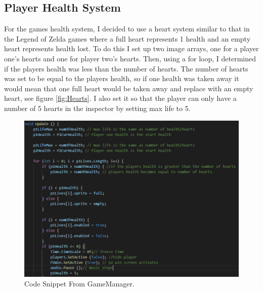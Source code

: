 \subsection{Player Health System}
For the games health system, I decided to use a heart system similar to that in the Legend of Zelda games where a full heart represents 1 health and an empty heart represents health lost. To do this I set up two image arrays, one for a player one's hearts and one for player two's hearts. Then, using a for loop, I determined if the players health was less than the number of hearts. The number of hearts was set to be equal to the players health, so if one health was taken away it would mean that one full heart would be taken away and replace with an empty heart, see figure \ref{fig:Hearts}. I also set it so that the player can only have a number of 5 hearts in the inspector by setting max life to 5.
\begin{figure}[h]
\centering
  \includegraphics[width= 0.9\linewidth]{Images/HealthSystem.PNG}
  \caption{Code Snippet From GameManager.}
  \label{fig:GameManagerCode}
\end{figure}
